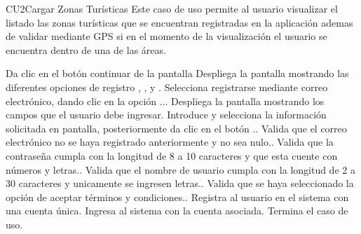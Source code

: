 
% 



	\begin{UseCase}{CU2}{Cargar Zonas Turísticas}{
		Este caso de uso permite al usuario visualizar el listado las zonas turísticas que se encuentran registradas en la aplicación ademas de validar mediante GPS si en el momento de la visualización el usuario se encuentra dentro de una de las áreas. 
	}
	\end{UseCase}
	\begin{UCtrayectoria} 
		\UCpaso[\UCactor] Da clic en el botón continuar de la pantalla 
		\UCpaso Despliega la pantalla  mostrando las diferentes opciones de registro , ,  y .
		\UCpaso[\UCactor] Selecciona registrarse mediante correo electrónico, dando clic en la opción ...
		\UCpaso Despliega la pantalla  mostrando los campos que el usuario debe ingresar.
		\UCpaso[\UCactor] Introduce y selecciona la información solicitada en pantalla, posteriormente da clic en el botón .\label{CU1-Registrar}.
		\UCpaso Valida que el correo electrónico no se haya registrado anteriormente y no sea nulo..
		\UCpaso Valida que la contraseña cumpla con la longitud de 8 a 10 caracteres y que esta cuente con números y letras..	
		\UCpaso Valida que el nombre de usuario cumpla con la longitud de 2 a 30 caracteres y unicamente se ingresen letras..
		\UCpaso Valida que se haya seleccionado la opción de aceptar términos y condiciones..
		\UCpaso Registra al usuario en el sistema con una cuenta única.
		\UCpaso Ingresa al sistema con la cuenta asociada.
		\UCpaso[] Termina el caso de uso.
		
	\end{UCtrayectoria}

